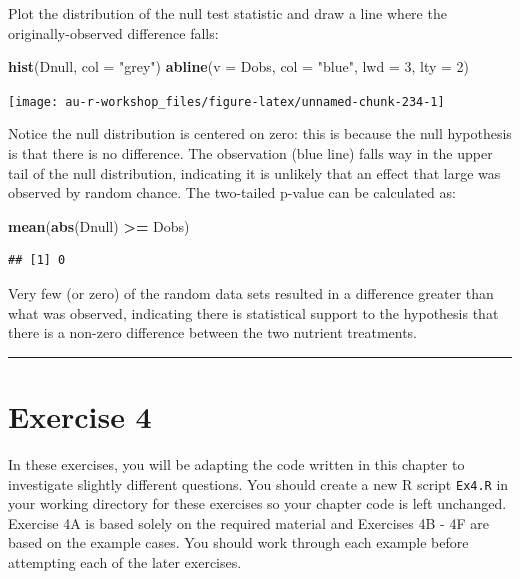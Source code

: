 \documentclass[]{book}
\newenvironment{Shaded}{\begin{snugshade}}{\end{snugshade}}
\newcommand{\KeywordTok}[1]{\textcolor[rgb]{0.13,0.29,0.53}{\textbf{#1}}}
\newcommand{\DataTypeTok}[1]{\textcolor[rgb]{0.13,0.29,0.53}{#1}}
\newcommand{\DecValTok}[1]{\textcolor[rgb]{0.00,0.00,0.81}{#1}}
\newcommand{\StringTok}[1]{\textcolor[rgb]{0.31,0.60,0.02}{#1}}
\newcommand{\OperatorTok}[1]{\textcolor[rgb]{0.81,0.36,0.00}{\textbf{#1}}}
\newcommand{\NormalTok}[1]{#1}
\theoremstyle{definition}
\theoremstyle{definition}
\theoremstyle{definition}
\theoremstyle{remark}
\begin{document}
Plot the distribution of the null test statistic and draw a line where
the originally-observed difference falls:

\begin{Shaded}
\begin{Highlighting}[]
\KeywordTok{hist}\NormalTok{(Dnull, }\DataTypeTok{col =} \StringTok{"grey"}\NormalTok{)}
\KeywordTok{abline}\NormalTok{(}\DataTypeTok{v =}\NormalTok{ Dobs, }\DataTypeTok{col =} \StringTok{"blue"}\NormalTok{, }\DataTypeTok{lwd =} \DecValTok{3}\NormalTok{, }\DataTypeTok{lty =} \DecValTok{2}\NormalTok{)}
\end{Highlighting}
\end{Shaded}

\begin{center}\texttt{[image: au-r-workshop\_files/figure-latex/unnamed-chunk-234-1]} \end{center}

Notice the null distribution is centered on zero: this is because the
null hypothesis is that there is no difference. The observation (blue
line) falls way in the upper tail of the null distribution, indicating
it is unlikely that an effect that large was observed by random chance.
The two-tailed p-value can be calculated as:

\begin{Shaded}
\begin{Highlighting}[]
\KeywordTok{mean}\NormalTok{(}\KeywordTok{abs}\NormalTok{(Dnull) }\OperatorTok{>=}\StringTok{ }\NormalTok{Dobs)}
\end{Highlighting}
\end{Shaded}

\begin{verbatim}
## [1] 0
\end{verbatim}

Very few (or zero) of the random data sets resulted in a difference
greater than what was observed, indicating there is statistical support
to the hypothesis that there is a non-zero difference between the two
nutrient treatments.

\begin{center}\rule{0.5\linewidth}{\linethickness}\end{center}

\section{Exercise 4}\label{exercise-4}

In these exercises, you will be adapting the code written in this
chapter to investigate slightly different questions. You should create a
new R script \texttt{Ex4.R} in your working directory for these
exercises so your chapter code is left unchanged. Exercise 4A is based
solely on the required material and Exercises 4B - 4F are based on the
example cases. You should work through each example before attempting
each of the later exercises.
\end{document}
